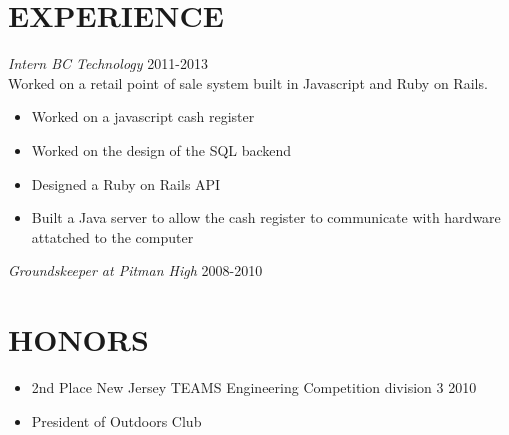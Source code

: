 \documentclass[line, margin]{res}
\begin{document}
\begin{resume}
    \section{EXPERIENCE}
    \textit{Intern BC Technology} \hfill 2011-2013 \\
    Worked on a retail point of sale system built in Javascript and Ruby on Rails.
    \begin{itemize}
      \item Worked on a javascript cash register
      \item Worked on the design of the SQL backend
      \item Designed a Ruby on Rails API
      \item Built a Java server to allow the cash register to communicate with hardware attatched to the computer
    \end{itemize}
    \textit{Groundskeeper at Pitman High} \hfill 2008-2010 \\
    \section{HONORS}
    \begin{itemize}
      \item 2nd Place New Jersey TEAMS Engineering Competition division 3 2010
      \item President of Outdoors Club
    \end{itemize}
  \end{resume}
\end{document}

